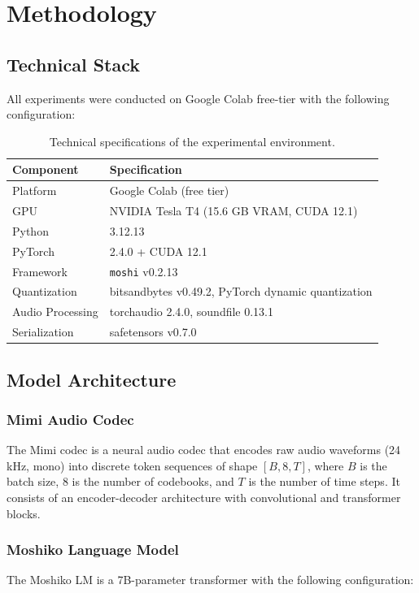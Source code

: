 \documentclass[12pt,a4paper]{report}
\begin{document}
\chapter{Methodology}

\section{Technical Stack}
All experiments were conducted on Google Colab free-tier with the following configuration:

\begin{table}[H]
\centering
\caption{Technical specifications of the experimental environment.}
\label{tab:tech_stack}
\begin{tabular}{@{}ll@{}}
\toprule
\textbf{Component} & \textbf{Specification} \\
\midrule
Platform & Google Colab (free tier) \\
GPU & NVIDIA Tesla T4 (15.6 GB VRAM, CUDA 12.1) \\
Python & 3.12.13 \\
PyTorch & 2.4.0 + CUDA 12.1 \\
Framework & \texttt{moshi} v0.2.13 \\
Quantization & bitsandbytes v0.49.2, PyTorch dynamic quantization \\
Audio Processing & torchaudio 2.4.0, soundfile 0.13.1 \\
Serialization & safetensors v0.7.0 \\
\bottomrule
\end{tabular}
\end{table}

\section{Model Architecture}

\subsection{Mimi Audio Codec}
The Mimi codec is a neural audio codec that encodes raw audio waveforms (24 kHz, mono) into discrete token sequences of shape $[B, 8, T]$, where $B$ is the batch size, $8$ is the number of codebooks, and $T$ is the number of time steps. It consists of an encoder-decoder architecture with convolutional and transformer blocks.

\subsection{Moshiko Language Model}
The Moshiko LM is a 7B-parameter transformer with the following configuration:
\end{document}
